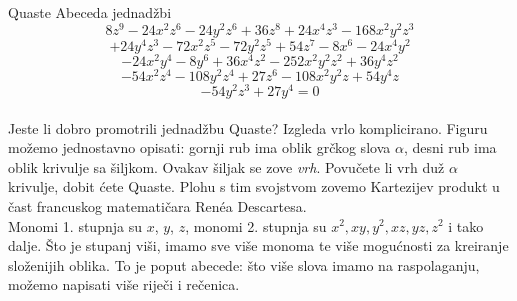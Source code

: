 \begin{surferPage}{Quaste}
Abeceda jednad\v{z}bi
  \smallskip
\[8z^9-24x^2z^6-24y^2z^6+36z^8+24x^4z^3-168x^2y^2z^3\]
\[+24y^4z^3-72x^2z^5-72y^2z^5+54z^7-8x^6-24x^4y^2\]
\[-24x^2y^4-8y^6 + 36x^4z^2-252x^2y^2z^2+36y^4z^2\]
\[- 54x^2z^4-108y^2z^4 + 27z^6-108x^2y^2z + 54y^4z\]
\[-54y^2z^3 + 27y^4 = 0\]\\
\vspace{0.3cm}
Jeste li dobro promotrili jednad\v{z}bu Quaste? Izgleda vrlo komplicirano.
Figuru mo\v{z}emo jednostavno opisati: gornji rub ima oblik gr\v{c}kog slova $\alpha$, desni rub ima oblik krivulje sa \v{s}iljkom. Ovakav \v{s}iljak se zove {\it vrh}. Povu\v{c}ete li vrh du\v{z} $\alpha$ krivulje, dobit \'{c}ete Quaste. Plohu s tim svojstvom zovemo Kartezijev produkt u \v{c}ast francuskog matemati\v{c}ara Ren\'ea Descartesa.  \\
\vspace{0.3cm}
Monomi 1. stupnja su $x$, $y$, $z$, monomi 2. stupnja su $x^2, xy, y^2, xz, yz, z^2$ i tako dalje. \v{S}to je stupanj vi\v{s}i, imamo sve vi\v{s}e monoma te vi\v{s}e mogu\'{c}nosti za kreiranje slo\v{z}enijih oblika. To je poput abecede: \v{s}to vi\v{s}e slova imamo na raspolaganju, mo\v{z}emo napisati vi\v{s}e rije\v{c}i i re\v{c}enica.
\end{surferPage}
